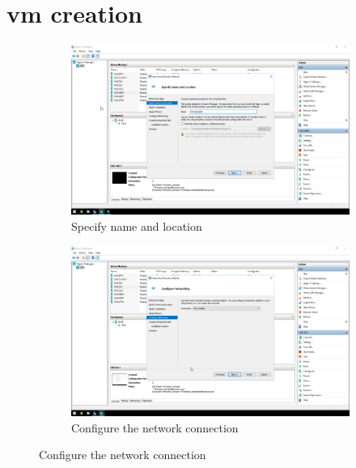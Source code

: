 \label{Migration}
\section{\acrfull{vm} creation}
\begin{figure}[!htb]
	\begin{subfigure}{0.5\textwidth}
		\captionsetup{width=0.8\linewidth}
		\includegraphics[width=0.9\linewidth]{img/Methodologie/Migration0.png}
		\centering
		\caption{Specify name and location}
	\end{subfigure}
	\begin{subfigure}{0.5\textwidth}
		\captionsetup{width=0.8\linewidth}
		\includegraphics[width=0.9\linewidth]{img/Methodologie/Migration1.png} 
		\centering
		\caption{Configure the network connection}
	\end{subfigure}
\end{figure}
